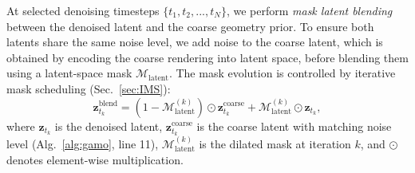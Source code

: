 \documentclass[runningheads]{llncs}
\begin{document}
At selected denoising timesteps $\{t_1, t_2, ..., t_N\}$, we perform \textit{mask latent blending} between the denoised latent and the coarse geometry prior. To ensure both latents share the same noise level, we add noise to the coarse latent, which is obtained by encoding the coarse rendering into latent space, before blending them using a latent-space mask $\mathcal{M}_{\text{latent}}$. The mask evolution is controlled by iterative mask scheduling (Sec.~\ref{sec:IMS}):
\begin{equation}
\mathbf{z}^{\text{blend}}_{t_k} = (1 - \mathcal{M}_{\text{latent}}^{(k)} ) \odot 
\mathbf{z}^{\text{coarse}}_{t_k} + \mathcal{M}_{\text{latent}}^{(k)} \odot \mathbf{z}_{t_k},
\label{eq:IMS}
\end{equation}
where $\mathbf{z}_{t_k}$ is the denoised latent, $\mathbf{z}^{\text{coarse}}_{t_k}$ 
is the coarse latent with matching noise level (Alg.~\ref{alg:gamo}, line 11), 
$\mathcal{M}_{\text{latent}}^{(k)}$ is the dilated mask at iteration $k$, and 
$\odot$ denotes element-wise multiplication.
\end{document}
